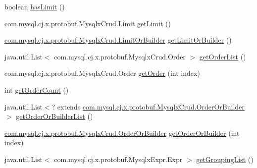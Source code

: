 \begin{DoxyCompactItemize}
\item 
boolean \mbox{\hyperlink{interfacecom_1_1mysql_1_1cj_1_1x_1_1protobuf_1_1_mysqlx_crud_1_1_find_or_builder_a1ae94f80d4eba71c8e1cfbc527734bc1}{has\+Limit}} ()
\item 
com.\+mysql.\+cj.\+x.\+protobuf.\+Mysqlx\+Crud.\+Limit \mbox{\hyperlink{interfacecom_1_1mysql_1_1cj_1_1x_1_1protobuf_1_1_mysqlx_crud_1_1_find_or_builder_a78bbb1a038f4dc03b39ba2e4646e4679}{get\+Limit}} ()
\item 
\mbox{\hyperlink{interfacecom_1_1mysql_1_1cj_1_1x_1_1protobuf_1_1_mysqlx_crud_1_1_limit_or_builder}{com.\+mysql.\+cj.\+x.\+protobuf.\+Mysqlx\+Crud.\+Limit\+Or\+Builder}} \mbox{\hyperlink{interfacecom_1_1mysql_1_1cj_1_1x_1_1protobuf_1_1_mysqlx_crud_1_1_find_or_builder_a9f919b4b33f4a06a495db5a41fc7df71}{get\+Limit\+Or\+Builder}} ()
\item 
java.\+util.\+List$<$ com.\+mysql.\+cj.\+x.\+protobuf.\+Mysqlx\+Crud.\+Order $>$ \mbox{\hyperlink{interfacecom_1_1mysql_1_1cj_1_1x_1_1protobuf_1_1_mysqlx_crud_1_1_find_or_builder_a12632001b580b6279841a945a6eed66c}{get\+Order\+List}} ()
\item 
com.\+mysql.\+cj.\+x.\+protobuf.\+Mysqlx\+Crud.\+Order \mbox{\hyperlink{interfacecom_1_1mysql_1_1cj_1_1x_1_1protobuf_1_1_mysqlx_crud_1_1_find_or_builder_acff019d4cb410d7d7c64f71c075e8217}{get\+Order}} (int index)
\item 
int \mbox{\hyperlink{interfacecom_1_1mysql_1_1cj_1_1x_1_1protobuf_1_1_mysqlx_crud_1_1_find_or_builder_a5b4fba35d60f286d31df36307d0263b1}{get\+Order\+Count}} ()
\item 
java.\+util.\+List$<$? extends \mbox{\hyperlink{interfacecom_1_1mysql_1_1cj_1_1x_1_1protobuf_1_1_mysqlx_crud_1_1_order_or_builder}{com.\+mysql.\+cj.\+x.\+protobuf.\+Mysqlx\+Crud.\+Order\+Or\+Builder}} $>$ \mbox{\hyperlink{interfacecom_1_1mysql_1_1cj_1_1x_1_1protobuf_1_1_mysqlx_crud_1_1_find_or_builder_ac60ac01c2e1e9656706f746bbd026ff6}{get\+Order\+Or\+Builder\+List}} ()
\item 
\mbox{\hyperlink{interfacecom_1_1mysql_1_1cj_1_1x_1_1protobuf_1_1_mysqlx_crud_1_1_order_or_builder}{com.\+mysql.\+cj.\+x.\+protobuf.\+Mysqlx\+Crud.\+Order\+Or\+Builder}} \mbox{\hyperlink{interfacecom_1_1mysql_1_1cj_1_1x_1_1protobuf_1_1_mysqlx_crud_1_1_find_or_builder_a9c53951b61bcf05a14b00a52cba40871}{get\+Order\+Or\+Builder}} (int index)
\item 
java.\+util.\+List$<$ com.\+mysql.\+cj.\+x.\+protobuf.\+Mysqlx\+Expr.\+Expr $>$ \mbox{\hyperlink{interfacecom_1_1mysql_1_1cj_1_1x_1_1protobuf_1_1_mysqlx_crud_1_1_find_or_builder_acd45a78eeebf7fbfffbc906dc259f5d8}{get\+Grouping\+List}} ()

\end{DoxyCompactItemize}

